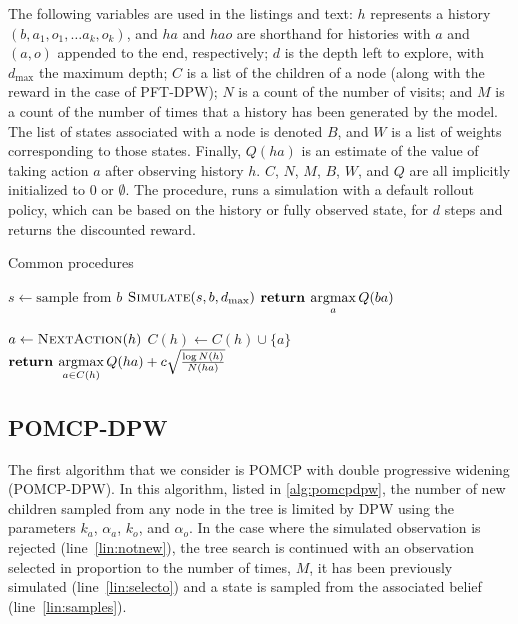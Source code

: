 The following variables are used in the listings and text:
$h$ represents a history $(b, a_1, o_1, \dots a_k, o_k)$, and $ha$ and $hao$ are shorthand for histories with $a$ and $(a,o)$ appended to the end, respectively;
$d$ is the depth left to explore, with $d_\text{max}$ the maximum depth;
$C$ is a list of the children of a node (along with the reward in the case of PFT-DPW);
$N$ is a count of the number of visits; and $M$ is a count of the number of times that a history has been generated by the model.
The list of states associated with a node is denoted $B$, and $W$ is a list of weights corresponding to those states.
Finally, $Q(ha)$ is an estimate of the value of taking action $a$ after observing history $h$.
$C$, $N$, $M$, $B$, $W$, and $Q$ are all implicitly initialized to \num{0} or $\emptyset$.
The  procedure, runs a simulation with a default rollout policy, which can be based on the history or fully observed state, for $d$ steps and returns the discounted reward.

\begin{algorithm}[htbp]
    \caption{Common procedures} \label{alg:common}
    \begin{algorithmic}[1]
                \State $s \gets \text{sample from }b$
                \State $\Call{Simulate}{s, b, d_\text{max}}$
            \EndFor
            \State $\textbf{return } \underset{a}{\argmax}\, Q(ba)$
        \EndProcedure

                \State $a \gets \Call{NextAction}{h}$
                \State $C(h) \gets C(h) \cup \{a\}$
            \EndIf
            \State $\textbf{return } \underset{a \in C(h)}{\argmax}\, Q(ha) + c \sqrt{\frac{\log N(h)}{N(ha)}}$
        \EndProcedure

    \end{algorithmic}
\end{algorithm}


\subsection{POMCP-DPW} \label{sec:pomcpdpw}

The first algorithm that we consider is POMCP with double progressive widening (POMCP-DPW).
In this algorithm, listed in \cref{alg:pomcpdpw}, the number of new children sampled from any node in the tree is limited by DPW using the parameters $k_a$, $\alpha_a$, $k_o$, and $\alpha_o$.
In the case where the simulated observation is rejected (line~\ref{lin:notnew}), the tree search is continued with an observation selected in proportion to the number of times, $M$, it has been previously simulated (line~\ref{lin:selecto}) and a state is sampled from the associated belief (line~\ref{lin:samples}).

